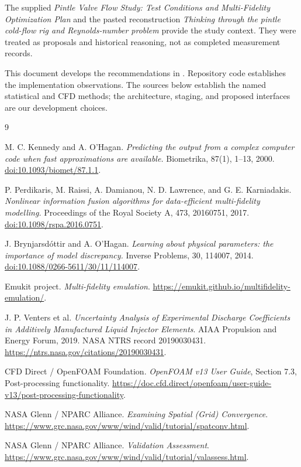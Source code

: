 \begingroup\raggedright
The supplied \emph{Pintle Valve Flow Study: Test Conditions and Multi-Fidelity Optimization Plan} and the pasted reconstruction \emph{Thinking through the pintle cold-flow rig and Reynolds-number problem} provide the study context. They were treated as proposals and historical reasoning, not as completed measurement records.

This document develops the recommendations in {\small{}}. Repository code establishes the implementation observations. The sources below establish the named statistical and CFD methods; the architecture, staging, and proposed interfaces are our development choices.
\par\endgroup

\clearpage
\begingroup
\small
\begin{thebibliography}{9}
M. C. Kennedy and A. O'Hagan.
\emph{Predicting the output from a complex computer code when fast approximations are available.}
Biometrika, 87(1), 1--13, 2000.
\href{https://doi.org/10.1093/biomet/87.1.1}{doi:10.1093/biomet/87.1.1}.

P. Perdikaris, M. Raissi, A. Damianou, N. D. Lawrence, and G. E. Karniadakis.
\emph{Nonlinear information fusion algorithms for data-efficient multi-fidelity modelling.}
Proceedings of the Royal Society A, 473, 20160751, 2017.
\href{https://doi.org/10.1098/rspa.2016.0751}{doi:10.1098/rspa.2016.0751}.

J. Brynjarsd\'ottir and A. O'Hagan.
\emph{Learning about physical parameters: the importance of model discrepancy.}
Inverse Problems, 30, 114007, 2014.
\href{https://doi.org/10.1088/0266-5611/30/11/114007}{doi:10.1088/0266-5611/30/11/114007}.

Emukit project.
\emph{Multi-fidelity emulation}.
\url{https://emukit.github.io/multifidelity-emulation/}.

J. P. Venters et al.
\emph{Uncertainty Analysis of Experimental Discharge Coefficients in Additively Manufactured Liquid Injector Elements}.
AIAA Propulsion and Energy Forum, 2019. NASA NTRS record 20190030431.
\url{https://ntrs.nasa.gov/citations/20190030431}.

CFD Direct / OpenFOAM Foundation.
\emph{OpenFOAM v13 User Guide}, Section 7.3, Post-processing functionality.
\url{https://doc.cfd.direct/openfoam/user-guide-v13/post-processing-functionality}.

NASA Glenn / NPARC Alliance.
\emph{Examining Spatial (Grid) Convergence}.
\url{https://www.grc.nasa.gov/www/wind/valid/tutorial/spatconv.html}.

NASA Glenn / NPARC Alliance.
\emph{Validation Assessment}.
\url{https://www.grc.nasa.gov/www/wind/valid/tutorial/valassess.html}.
\end{thebibliography}
\endgroup
